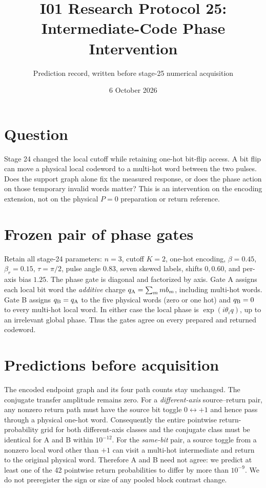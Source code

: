 \documentclass[10pt,a4paper]{article}
\title{I01 Research Protocol 25: Intermediate-Code Phase Intervention}
\author{Prediction record, written before stage-25 numerical acquisition}
\date{6 October 2026}
\begin{document}
\maketitle
\vspace{-2em}

\section*{Question}
Stage 24 changed the local cutoff while retaining one-hot bit-flip access. A bit flip can move a physical local codeword to a multi-hot word between the two pulses. Does the support graph alone fix the measured response, or does the phase action on those temporary invalid words matter? This is an intervention on the encoding extension, not on the physical $P=0$ preparation or return reference.

\section*{Frozen pair of phase gates}
Retain all stage-24 parameters: $n=3$, cutoff $K=2$, one-hot encoding, $\beta=0.45$, $\beta_r=0.15$, $\tau=\pi/2$, pulse angle $0.83$, seven skewed labels, shifts $0,0.60$, and per-axis bias $1.25$. The phase gate is diagonal and factorized by axis. Gate A assigns each local bit word the \emph{additive} charge $q_{\rm A}=\sum_m m b_m$, including multi-hot words. Gate B assigns $q_{\rm B}=q_{\rm A}$ to the five physical words (zero or one hot) and $q_{\rm B}=0$ to every multi-hot local word. In either case the local phase is $\exp(i\theta_i q)$, up to an irrelevant global phase. Thus the gates agree on every prepared and returned codeword.

\section*{Predictions before acquisition}
The encoded endpoint graph and its four path counts stay unchanged. The conjugate transfer amplitude remains zero. For a \emph{different-axis} source--return pair, any nonzero return path must have the source bit toggle $0\leftrightarrow+1$ and hence pass through a physical one-hot word. Consequently the entire pointwise return-probability grid for both different-axis classes and the conjugate class must be identical for A and B within $10^{-12}$. For the \emph{same-bit} pair, a source toggle from a nonzero local word other than $+1$ can visit a multi-hot intermediate and return to the original physical word. Therefore A and B need not agree: we predict at least one of the 42 pointwise return probabilities to differ by more than $10^{-9}$. We do not preregister the sign or size of any pooled block contrast change.
\end{document}
